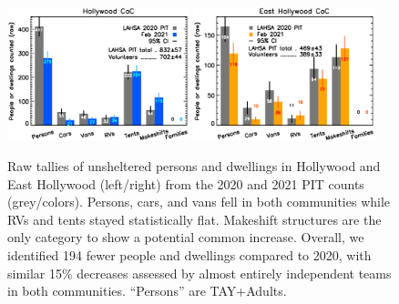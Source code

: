 \documentclass[11pt]{article}
\def\resp{respectively}
\begin{document}
\begin{figure}[h]
	\centering
	\includegraphics[width = 0.47\textwidth, trim = 1cm 0cm 0cm 0cm]{Hwood2021Bars}
	\includegraphics[width = 0.47\textwidth, trim = 0cm 0cm 1cm 0cm]{Eho2021Bars}
	\caption{Raw tallies of unsheltered persons and dwellings in Hollywood and East Hollywood
			(left/right) from the 2020 and 2021 PIT counts (grey/colors). Persons, cars, 
			and vans fell in both communities while RVs and tents stayed statistically flat. 
			Makeshift structures are the only category to show a potential common increase. 
			Overall, we identified 194 fewer people and dwellings compared to 2020,
			with similar 15\% decreases assessed by almost entirely independent teams
			in both communities. ``Persons'' are TAY+Adults.}
	\label{fig:rawCounts}
\end{figure}

\end{document}

